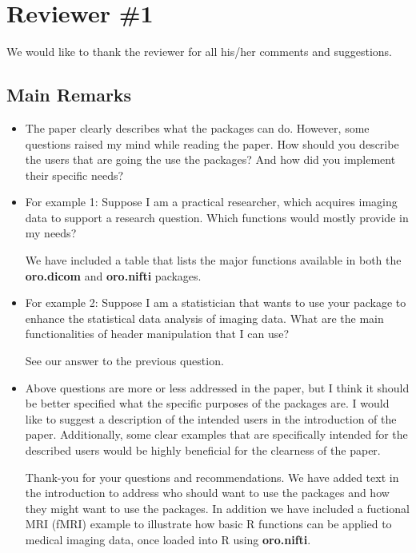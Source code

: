 \documentclass[11pt]{article}
\begin{document}
\section*{Reviewer \#1}

We would like to thank the reviewer for all his/her comments and
suggestions.

\subsection*{Main Remarks}

\begin{itemize}

\item The paper clearly describes what the packages can do. However,
  some questions raised my mind while reading the paper. How should
  you describe the users that are going the use the packages? And how
  did you implement their specific needs?  

\item For example 1: Suppose I am a practical researcher, which
  acquires imaging data to support a research question.  Which
  functions would mostly provide in my needs?

  We have included a table that lists the major functions available in
  both the \textbf{oro.dicom} and \textbf{oro.nifti} packages.

\item For example 2: Suppose I am a statistician that wants to use
  your package to enhance the statistical data analysis of imaging
  data.  What are the main functionalities of header manipulation that
  I can use?

  See our answer to the previous question.

\item Above questions are more or less addressed in the paper, but I
  think it should be better specified what the specific purposes of
  the packages are.  I would like to suggest a description of the
  intended users in the introduction of the paper.  Additionally, some
  clear examples that are specifically intended for the described
  users would be highly beneficial for the clearness of the paper.

  Thank-you for your questions and recommendations.  We have added
  text in the introduction to address who should want to use the
  packages and how they might want to use the packages.  In addition
  we have included a fuctional MRI (fMRI) example to illustrate how
  basic \textsf{R} functions can be applied to medical imaging data,
  once loaded into \textsf{R} using \textbf{oro.nifti}.

\end{itemize}
\end{document}
